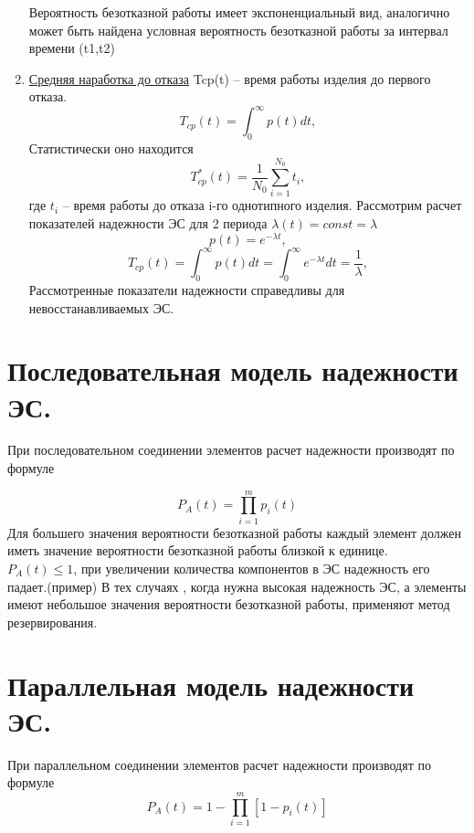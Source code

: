 \documentclass[unicode, 12pt, a4paper, oneside]{article}
\begin{document}
\begin{enumerate}
Вероятность безотказной работы имеет экспоненциальный вид, аналогично может быть найдена условная вероятность безотказной работы за интервал времени (t1,t2)
\item \underline{	Средняя наработка до отказа}
Tcp(t) – время работы изделия до первого отказа.
\begin{equation}
T_{cp} (t)= \int_0^\infty p(t)dt,
\end{equation}
Статистически оно находится
\begin{equation}
T^{*}_{cp} (t) = \frac{1}{N_0} \sum_{i=1}^{N_0} t_i,
\end{equation}
где $t_i$ – время работы до отказа i-го однотипного изделия.
Рассмотрим расчет показателей надежности ЭС для 2 периода $ \lambda(t)=const = \lambda$
\begin{equation}
p(t)= e^{- \lambda t},
\end{equation}
\begin{equation}
T_{cp}(t) = \int_0^\infty p(t)dt= \int_0^\infty e^{- \lambda t}dt = \frac{1}{\lambda},
\end{equation}
Рассмотренные показатели надежности справедливы для невосстанавливаемых ЭС.
\end{enumerate}

\section{Последовательная модель надежности ЭС.}

При последовательном соединении элементов расчет надежности производят по формуле %

 \begin{equation}
 P_A(t) = {\prod_{i=1}^{m}p_i(t) }
 \end{equation}
Для большего значения вероятности безотказной работы каждый элемент должен иметь значение вероятности безотказной работы близкой к единице.\\
$P_A(t)\leqslant1$,
 при увеличении количества компонентов в ЭС надежность его падает.(пример)
В тех случаях , когда нужна высокая надежность ЭС, а элементы имеют небольшое значения вероятности безотказной работы, применяют метод резервирования.

\section{Параллельная модель надежности ЭС.}

При параллельном соединении элементов расчет надежности производят по формуле 
 \begin{equation}
 P_A(t) = {1- \prod_{i=1}^{m}[1-p_i(t)] }
 \end{equation}
\end{document}
